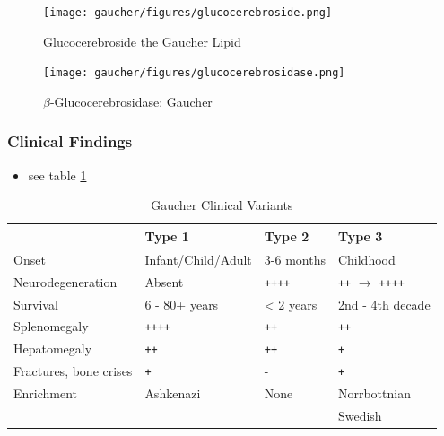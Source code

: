 \documentclass[12pt]{scrartcl}
\begin{document}
\begin{figure}[htbp]
\centering
\texttt{[image: gaucher/figures/glucocerebroside.png]}
\caption{\label{fig:org8bf1598}Glucocerebroside the Gaucher Lipid}
\end{figure}

\begin{figure}[htbp]
\centering
\texttt{[image: gaucher/figures/glucocerebrosidase.png]}
\caption{\label{fig:orgda94687}\(\beta\)-Glucocerebrosidase: Gaucher}
\end{figure}

\subsubsection{Clinical Findings}
\label{sec:orgf0bad5f}
\begin{itemize}
\item see table \ref{tab:orga39c1d4}
\end{itemize}

\begin{table}[htbp]
\caption{\label{tab:orga39c1d4}Gaucher Clinical Variants}
\centering
\begin{tabular}{llll}
 & Type 1 & Type 2 & Type 3\\
\hline
Onset & Infant/Child/Adult & 3-6 months & Childhood\\
Neurodegeneration & Absent & \texttt{++++} & \texttt{++} \(\to\) \texttt{++++}\\
Survival & 6 - 80+ years & < 2 years & 2nd - 4th decade\\
Splenomegaly & \texttt{++++} & \texttt{++} & \texttt{++}\\
Hepatomegaly & \texttt{++} & \texttt{++} & \texttt{+}\\
Fractures, bone crises & \texttt{+} & - & \texttt{+}\\
Enrichment & Ashkenazi & None & Norrbottnian\\
 &  &  & Swedish\\
\end{tabular}
\end{table}
\end{document}
